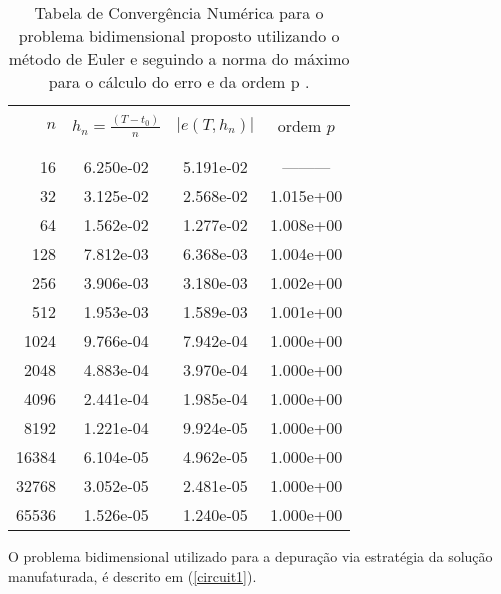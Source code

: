 \documentclass[12pt]{article}
\begin{document}
             \begin{table}[!ht]
    \centering
    \begin{tabular}{rccc}
    \hline\hline\\
          $n$ & $h_n=\displaystyle \frac{(T-t_0)}{n}$ 
              & $\left|e(T, h_n)\right|$  & ordem $p$\\\\
   \hline\hline\\

   16 & 6.250e-02 & 5.191e-02 & --------- \\
   32 & 3.125e-02 & 2.568e-02 & 1.015e+00 \\
   64 & 1.562e-02 & 1.277e-02 & 1.008e+00 \\
  128 & 7.812e-03 & 6.368e-03 & 1.004e+00 \\
  256 & 3.906e-03 & 3.180e-03 & 1.002e+00 \\
  512 & 1.953e-03 & 1.589e-03 & 1.001e+00 \\
 1024 & 9.766e-04 & 7.942e-04 & 1.000e+00 \\
 2048 & 4.883e-04 & 3.970e-04 & 1.000e+00 \\
 4096 & 2.441e-04 & 1.985e-04 & 1.000e+00 \\
 8192 & 1.221e-04 & 9.924e-05 & 1.000e+00 \\
16384 & 6.104e-05 & 4.962e-05 & 1.000e+00 \\
32768 & 3.052e-05 & 2.481e-05 & 1.000e+00 \\
65536 & 1.526e-05 & 1.240e-05 & 1.000e+00 \\

   
   \hline\hline \end{tabular}
   \caption{Tabela de Convergência Numérica para o problema bidimensional proposto utilizando o método de Euler e seguindo a norma do máximo para o cálculo do erro e da ordem p .}
   \label{tabela2}
\end{table}

               \hspace{0.7cm}O problema bidimensional utilizado para a depuração via estratégia da solução manufaturada, é descrito em (\ref{circuit1}).
               
\end{document}
